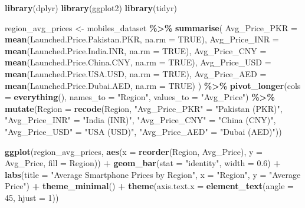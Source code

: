 \documentclass[
]{article}
\newenvironment{Shaded}{\begin{snugshade}}{\end{snugshade}}
\newcommand{\AttributeTok}[1]{\textcolor[rgb]{0.13,0.29,0.53}{#1}}
\newcommand{\ConstantTok}[1]{\textcolor[rgb]{0.56,0.35,0.01}{#1}}
\newcommand{\DecValTok}[1]{\textcolor[rgb]{0.00,0.00,0.81}{#1}}
\newcommand{\FloatTok}[1]{\textcolor[rgb]{0.00,0.00,0.81}{#1}}
\newcommand{\FunctionTok}[1]{\textcolor[rgb]{0.13,0.29,0.53}{\textbf{#1}}}
\newcommand{\NormalTok}[1]{#1}
\newcommand{\OtherTok}[1]{\textcolor[rgb]{0.56,0.35,0.01}{#1}}
\newcommand{\SpecialCharTok}[1]{\textcolor[rgb]{0.81,0.36,0.00}{\textbf{#1}}}
\newcommand{\StringTok}[1]{\textcolor[rgb]{0.31,0.60,0.02}{#1}}
\begin{document}
\begin{Shaded}
\begin{Highlighting}[]
\FunctionTok{library}\NormalTok{(dplyr)}
\FunctionTok{library}\NormalTok{(ggplot2)}
\FunctionTok{library}\NormalTok{(tidyr)}

\NormalTok{region\_avg\_prices }\OtherTok{\textless{}{-}}\NormalTok{ mobiles\_dataset }\SpecialCharTok{\%\textgreater{}\%}
  \FunctionTok{summarise}\NormalTok{(}
    \AttributeTok{Avg\_Price\_PKR =} \FunctionTok{mean}\NormalTok{(Launched.Price.Pakistan.PKR, }\AttributeTok{na.rm =} \ConstantTok{TRUE}\NormalTok{),}
    \AttributeTok{Avg\_Price\_INR =} \FunctionTok{mean}\NormalTok{(Launched.Price.India.INR, }\AttributeTok{na.rm =} \ConstantTok{TRUE}\NormalTok{),}
    \AttributeTok{Avg\_Price\_CNY =} \FunctionTok{mean}\NormalTok{(Launched.Price.China.CNY, }\AttributeTok{na.rm =} \ConstantTok{TRUE}\NormalTok{),}
    \AttributeTok{Avg\_Price\_USD =} \FunctionTok{mean}\NormalTok{(Launched.Price.USA.USD, }\AttributeTok{na.rm =} \ConstantTok{TRUE}\NormalTok{),}
    \AttributeTok{Avg\_Price\_AED =} \FunctionTok{mean}\NormalTok{(Launched.Price.Dubai.AED, }\AttributeTok{na.rm =} \ConstantTok{TRUE}\NormalTok{)}
\NormalTok{  ) }\SpecialCharTok{\%\textgreater{}\%}
  \FunctionTok{pivot\_longer}\NormalTok{(}\AttributeTok{cols =} \FunctionTok{everything}\NormalTok{(), }\AttributeTok{names\_to =} \StringTok{"Region"}\NormalTok{, }\AttributeTok{values\_to =} \StringTok{"Avg\_Price"}\NormalTok{) }\SpecialCharTok{\%\textgreater{}\%}
  \FunctionTok{mutate}\NormalTok{(}\AttributeTok{Region =} \FunctionTok{recode}\NormalTok{(Region,}
                         \StringTok{"Avg\_Price\_PKR"} \OtherTok{=} \StringTok{"Pakistan (PKR)"}\NormalTok{,}
                         \StringTok{"Avg\_Price\_INR"} \OtherTok{=} \StringTok{"India (INR)"}\NormalTok{,}
                         \StringTok{"Avg\_Price\_CNY"} \OtherTok{=} \StringTok{"China (CNY)"}\NormalTok{,}
                         \StringTok{"Avg\_Price\_USD"} \OtherTok{=} \StringTok{"USA (USD)"}\NormalTok{,}
                         \StringTok{"Avg\_Price\_AED"} \OtherTok{=} \StringTok{"Dubai (AED)"}\NormalTok{))}

\FunctionTok{ggplot}\NormalTok{(region\_avg\_prices, }\FunctionTok{aes}\NormalTok{(}\AttributeTok{x =} \FunctionTok{reorder}\NormalTok{(Region, Avg\_Price), }\AttributeTok{y =}\NormalTok{ Avg\_Price, }\AttributeTok{fill =}\NormalTok{ Region)) }\SpecialCharTok{+}
  \FunctionTok{geom\_bar}\NormalTok{(}\AttributeTok{stat =} \StringTok{"identity"}\NormalTok{, }\AttributeTok{width =} \FloatTok{0.6}\NormalTok{) }\SpecialCharTok{+}
  \FunctionTok{labs}\NormalTok{(}\AttributeTok{title =} \StringTok{"Average Smartphone Prices by Region"}\NormalTok{,}
       \AttributeTok{x =} \StringTok{"Region"}\NormalTok{, }\AttributeTok{y =} \StringTok{"Average Price"}\NormalTok{) }\SpecialCharTok{+}
  \FunctionTok{theme\_minimal}\NormalTok{() }\SpecialCharTok{+}
  \FunctionTok{theme}\NormalTok{(}\AttributeTok{axis.text.x =} \FunctionTok{element\_text}\NormalTok{(}\AttributeTok{angle =} \DecValTok{45}\NormalTok{, }\AttributeTok{hjust =} \DecValTok{1}\NormalTok{))}
\end{Highlighting}
\end{Shaded}
\end{document}
